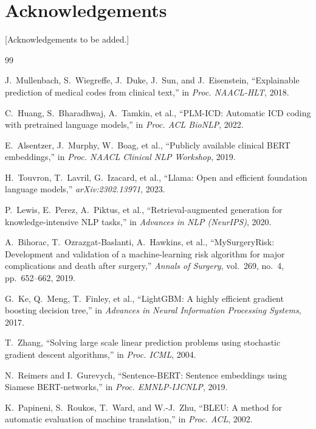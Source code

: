 \documentclass[10pt,twocolumn]{article}
\begin{document}
\section*{Acknowledgements}
[Acknowledgements to be added.]


\begin{thebibliography}{99}

J.~Mullenbach, S.~Wiegreffe, J.~Duke, J.~Sun, and J.~Eisenstein,
``Explainable prediction of medical codes from clinical text,''
in \textit{Proc. NAACL-HLT}, 2018.

C.~Huang, S.~Bharadhwaj, A.~Tamkin, et al.,
``PLM-ICD: Automatic ICD coding with pretrained language models,''
in \textit{Proc. ACL BioNLP}, 2022.

E.~Alsentzer, J.~Murphy, W.~Boag, et al.,
``Publicly available clinical BERT embeddings,''
in \textit{Proc. NAACL Clinical NLP Workshop}, 2019.

H.~Touvron, T.~Lavril, G.~Izacard, et al.,
``Llama: Open and efficient foundation language models,''
\textit{arXiv:2302.13971}, 2023.

P.~Lewis, E.~Perez, A.~Piktus, et al.,
``Retrieval-augmented generation for knowledge-intensive NLP tasks,''
in \textit{Advances in NLP (NeurIPS)}, 2020.

A.~Bihorac, T.~Ozrazgat-Baslanti, A.~Hawkins, et al.,
``MySurgeryRisk: Development and validation of a machine-learning risk algorithm for major complications and death after surgery,''
\textit{Annals of Surgery}, vol.~269, no.~4, pp.~652--662, 2019.

G.~Ke, Q.~Meng, T.~Finley, et al.,
``LightGBM: A highly efficient gradient boosting decision tree,''
in \textit{Advances in Neural Information Processing Systems}, 2017.

T.~Zhang,
``Solving large scale linear prediction problems using stochastic gradient descent algorithms,''
in \textit{Proc. ICML}, 2004.

N.~Reimers and I.~Gurevych,
``Sentence-BERT: Sentence embeddings using Siamese BERT-networks,''
in \textit{Proc. EMNLP-IJCNLP}, 2019.

K.~Papineni, S.~Roukos, T.~Ward, and W.-J.~Zhu,
``BLEU: A method for automatic evaluation of machine translation,''
in \textit{Proc. ACL}, 2002.


\end{thebibliography}
\end{document}
